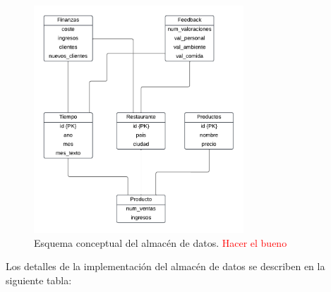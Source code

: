 \documentclass[11pt]{opticajnl}
\begin{document}
\begin{figure}[h]
\centering
\includegraphics[width=0.7\textwidth]{fotos/3.pdf}
\caption{Esquema conceptual del almacén de datos. \textcolor{red}{Hacer el bueno}}
\label{fig:esquema_almacen}
\end{figure}

Los detalles de la implementación del almacén de datos se describen en la siguiente tabla: 
\end{document}
